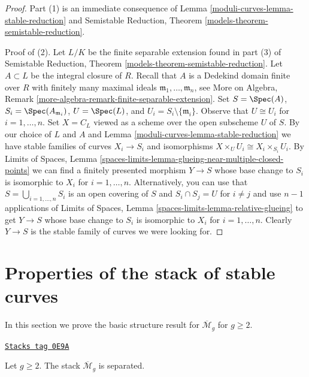 \begin{proof}
Part (1) is an immediate consequence of Lemma \ref{moduli-curves-lemma-stable-reduction} and
Semistable Reduction, Theorem \ref{models-theorem-semistable-reduction}.

\medskip\noindent
Proof of (2). Let $L/K$ be the finite separable extension found in part (3) of
Semistable Reduction, Theorem \ref{models-theorem-semistable-reduction}.
Let $A \subset L$ be the integral closure of $R$.
Recall that $A$ is a Dedekind domain finite over $R$ with
finitely many maximal ideals $\mathfrak m_1, \ldots, \mathfrak m_n$, see
More on Algebra, Remark \ref{more-algebra-remark-finite-separable-extension}.
Set $S = \Spec(A)$, $S_i = \Spec(A_{\mathfrak m_i})$,
$U = \Spec(L)$, and $U_i = S_i \setminus \{\mathfrak m_i\}$.
Observe that $U \cong U_i$ for $i = 1, \ldots, n$.
Set $X = C_L$ viewed as a scheme over the open subscheme $U$ of $S$.
By our choice of $L$ and $A$ and Lemma \ref{moduli-curves-lemma-stable-reduction}
we have stable families of curves $X_i \to S_i$ and isomorphisms
$X \times_U U_i \cong X_i \times_{S_i} U_i$.
By Limits of Spaces, Lemma
\ref{spaces-limits-lemma-glueing-near-multiple-closed-points}
we can find a finitely presented morphism $Y \to S$
whose base change to $S_i$ is isomorphic to $X_i$ for $i = 1, \ldots, n$.
Alternatively, you can use that $S = \bigcup_{i = 1, \ldots, n} S_i$
is an open covering of $S$ and $S_i \cap S_j = U$ for $i \not = j$
and use $n - 1$ applications of
Limits of Spaces, Lemma \ref{spaces-limits-lemma-relative-glueing}
to get $Y \to S$ whose
base change to $S_i$ is isomorphic to $X_i$ for $i = 1, \ldots, n$.
Clearly $Y \to S$ is the stable family of curves we were looking for.
\end{proof}

\section{Properties of the stack of stable curves}
\label{moduli-curves-section-properties-stable}
In this section we prove the basic structure result for
$\overline{\mathcal{M}}_g$ for $g \geq 2$.

\begin{lemma}
\label{moduli-curves-lemma-stable-separated}
\href{https://stacks.math.columbia.edu/tag/0E9A}{\texttt{Stacks tag 0E9A}}

Let $g \geq 2$. The stack $\overline{\mathcal{M}}_g$ is separated.
\end{lemma}

